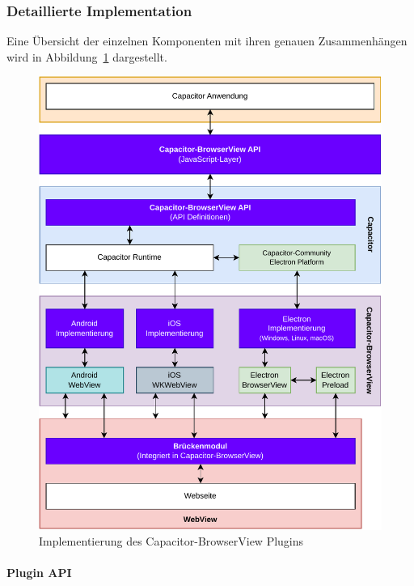 \subsubsection{Detaillierte Implementation}

Eine Übersicht der einzelnen Komponenten mit ihren genauen Zusammenhängen wird in Abbildung~\ref{asset:Capacitor-BrowserView:Implementation} dargestellt.

\begin{figure}[H]
    \centering
    \vspace{1em}
    \includegraphics[width=\textwidth]{assets/03_Capacitor-BrowserView/03_Implementation.drawio.pdf}
    \caption[Capacitor-BrowserView / Implementierung]{Implementierung des Capacitor-BrowserView Plugins}
    \label{asset:Capacitor-BrowserView:Implementation}
\end{figure}

\newpage

\paragraph{Plugin API}

